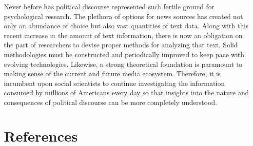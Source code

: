 \documentclass[
  english,
  man]{apa6}
\begin{document}
Never before has political discourse represented such fertile ground for psychological research. The plethora of options for news sources has created not only an abundance of choice but also vast quantities of text data. Along with this recent increase in the amount of text information, there is now an obligation on the part of researchers to devise proper methods for analyzing that text. Solid methodologies must be constructed and periodically improved to keep pace with evolving technologies. Likewise, a strong theoretical foundation is paramount to making sense of the current and future media ecosystem. Therefore, it is incumbent upon social scientists to continue investigating the information consumed by millions of Americans every day so that insights into the nature and consequences of political discourse can be more completely understood.

\newpage

\hypertarget{references}{%
\section{References}\label{references}}

\begingroup
\end{document}
